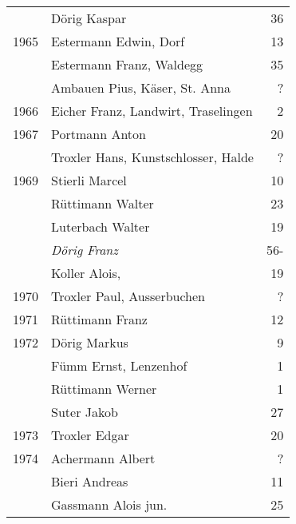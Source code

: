 {\begin{longtable}{ l l r }
                      & Dörig Kaspar                              & 36          \\
        1965          & Estermann Edwin, Dorf                     & 13          \\
                      & Estermann Franz, Waldegg                  & 35          \\
                      & Ambauen Pius, Käser, St. Anna             & ?           \\
        1966          & Eicher Franz, Landwirt, Traselingen       & 2           \\
        1967          & Portmann Anton                            & 20          \\
                      & Troxler Hans, Kunstschlosser, Halde       & ?           \\
        1969          & Stierli Marcel                            & 10          \\
                      & Rüttimann Walter                          & 23          \\
                      & Luterbach Walter                          & 19          \\
                      & \emph{Dörig Franz}                        & 56-         \\
                      & Koller Alois,                             & 19          \\
        1970          & Troxler Paul, Ausserbuchen                & ?           \\
        1971          & Rüttimann Franz                           & 12          \\
        1972          & Dörig Markus                              & 9           \\
                      & Fümm Ernst, Lenzenhof                     & 1           \\
                      & Rüttimann Werner                          & 1           \\
                      & Suter Jakob                               & 27          \\
        1973          & Troxler Edgar                             & 20          \\
        1974          & Achermann Albert                          & ?           \\
                      & Bieri Andreas                             & 11          \\
                      & Gassmann Alois jun.                       & 25          \\

\end{longtable}}
